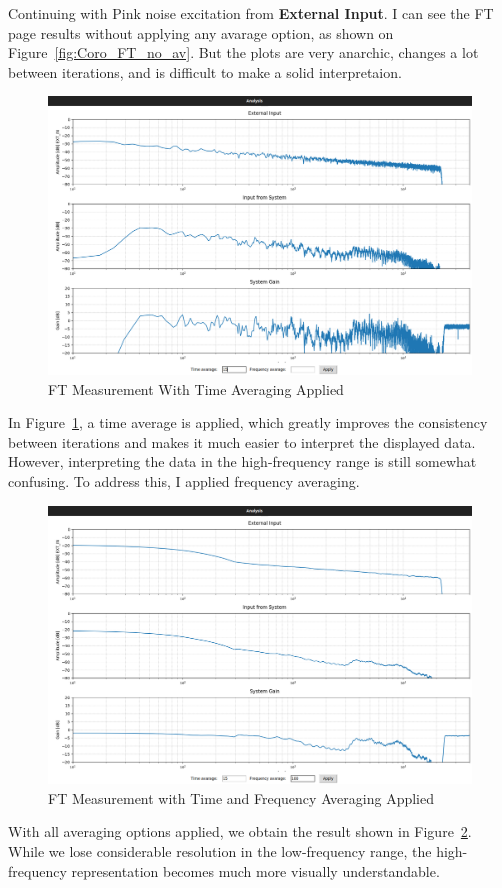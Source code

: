 Continuing with Pink noise excitation from \textbf{External Input}. I can see the FT page results without applying any avarage option, as shown on Figure~\ref{fig:Coro_FT_no_av}. But the plots are very anarchic, changes a lot between iterations, and is difficult to make a solid interpretaion.

\begin{figure}[H]
	\centering
	\includegraphics[width=0.6
	\linewidth]{Figures/Coro_FT_time_av.png}
	\caption{FT Measurement With Time Averaging Applied}
	\label{fig:Coro_FT_time_av}
\end{figure}

In Figure~\ref{fig:Coro_FT_time_av}, a time average is applied, which greatly improves the consistency between iterations and makes it much easier to interpret the displayed data. However, interpreting the data in the high-frequency range is still somewhat confusing. To address this, I applied frequency averaging.

\begin{figure}[H]
	\centering
	\includegraphics[width=0.6
	\linewidth]{Figures/Coro_FT_WITH_av.png}
	\caption{FT Measurement with Time and Frequency Averaging Applied}
	\label{fig:Coro_FT_av}
\end{figure}

With all averaging options applied, we obtain the result shown in Figure~\ref{fig:Coro_FT_av}. While we lose considerable resolution in the low-frequency range, the high-frequency representation becomes much more visually understandable.

